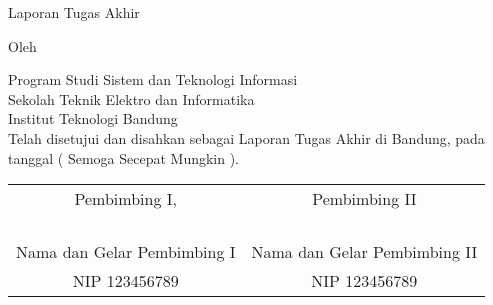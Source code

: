 \clearpage
\pagestyle{empty}

\begin{center}
\smallskip

    \Large \bfseries \MakeUppercase{\thetitle}
    \vfill

    \Large Laporan Tugas Akhir
    \vfill

    \large Oleh

    \Large \theauthor

    \large Program Studi Sistem dan Teknologi Informasi \\
    Sekolah Teknik Elektro dan Informatika \\
    Institut Teknologi Bandung \\

    \vfill
    \normalsize \normalfont
    Telah disetujui dan disahkan sebagai Laporan Tugas Akhir di Bandung, pada
    tanggal ( Semoga Secepat Mungkin ).

    \vfill
    \setlength{\tabcolsep}{12pt}
    \begin{tabular}{c@{\hskip 0.5in}c}
        Pembimbing I, & Pembimbing II \\
        & \\
        & \\
        & \\
        & \\
        Nama dan Gelar Pembimbing I & Nama dan Gelar Pembimbing II \\
        NIP 123456789 & NIP 123456789 \\
    \end{tabular}

\end{center}
\clearpage
